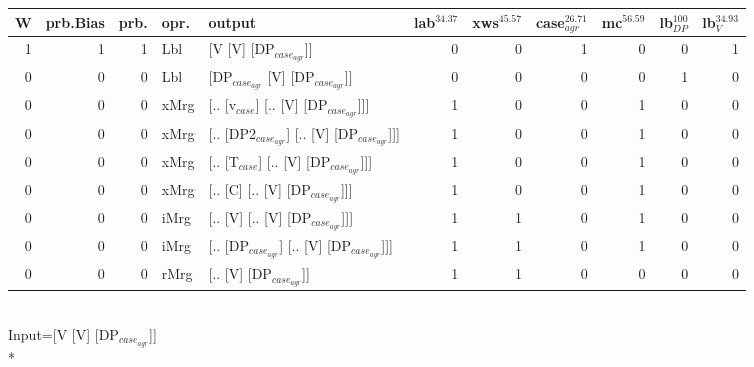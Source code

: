 \begin{tabularx}{\linewidth}{rrrlXrrrrrr}
\hline
   W &   prb.Bias &   prb. & opr.   & output                                     &   lab$^{34.37}$ &   xws$^{45.57}$ &   case$_{agr}^{26.71}$ &   mc$^{56.59}$ &   lb$_{DP}^{100}$ &   lb$_{V}^{34.93}$ \\
\hline
   1 &       1 &   1 & Lbl  & [V [V] [DP$_{case_{agr}}$]]                      &             0 &             0 &                  1 &            0 &                0 &              1 \\
   0 &       0 &   0 & Lbl  & [DP$_{case_{agr}}$ [V] [DP$_{case_{agr}}$]]            &             0 &             0 &                  0 &            0 &                1 &              0 \\
   0 &       0 &   0 & xMrg & [.. [v$_{case}$] [.. [V] [DP$_{case_{agr}}$]]]       &             1 &             0 &                  0 &            1 &                0 &              0 \\
   0 &       0 &   0 & xMrg & [.. [DP2$_{case_{agr}}$] [.. [V] [DP$_{case_{agr}}$]]] &             1 &             0 &                  0 &            1 &                0 &              0 \\
   0 &       0 &   0 & xMrg & [.. [T$_{case}$] [.. [V] [DP$_{case_{agr}}$]]]       &             1 &             0 &                  0 &            1 &                0 &              0 \\
   0 &       0 &   0 & xMrg & [.. [C] [.. [V] [DP$_{case_{agr}}$]]]            &             1 &             0 &                  0 &            1 &                0 &              0 \\
   0 &       0 &   0 & iMrg & [.. [V] [.. [V] [DP$_{case_{agr}}$]]]            &             1 &             1 &                  0 &            1 &                0 &              0 \\
   0 &       0 &   0 & iMrg & [.. [DP$_{case_{agr}}$] [.. [V] [DP$_{case_{agr}}$]]]  &             1 &             1 &                  0 &            1 &                0 &              0 \\
   0 &       0 &   0 & rMrg & [.. [V] [DP$_{case_{agr}}$]]                     &             1 &             1 &                  0 &            0 &                0 &              0 \\
\hline
\end{tabularx}\endgroup\\
\begingroup\scriptsize Input=[V [V] [DP$_{case_{agr}}$]]\\*
